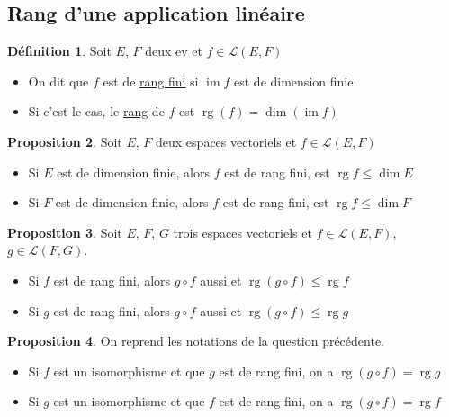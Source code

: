\documentclass[10pt,a4paper]{article}
\theoremstyle{definition}
\newtheorem{proposition}{Proposition}[section]
\newtheorem{definition}[proposition]{Définition}
\DeclareMathOperator{\rg}{rg}
\DeclareMathOperator{\im}{im}
\begin{document}
\subsection{Rang d'une application linéaire}
\begin{definition}
Soit $E$, $F$ deux ev et $f \in \mathcal{L}(E, F)$
\begin{itemize}
\item On dit que $f$ est de \uline{rang fini} si $\im f$ est de dimension finie.
\item Si c'est le cas, le \uline{rang} de $f$ est $\rg (f) = \dim (\im f)$
\end{itemize}
\end{definition}
\begin{proposition}
Soit $E$, $F$ deux espaces vectoriels et $f \in \mathcal{L}(E, F)$
\begin{itemize}
\item Si $E$ est de dimension finie, alors $f$ est de rang fini, est $\rg f \leq \dim E$
\item Si $F$ est de dimension finie, alors $f$ est de rang fini, est $\rg f \leq \dim F$
\end{itemize}
\end{proposition}
\begin{proposition}
Soit $E$, $F$, $G$ trois espaces vectoriels et $f \in \mathcal{L}(E, F)$, $g \in \mathcal{L}(F, G)$.
\begin{itemize}
\item Si $f$ est de rang fini, alors $g \circ f$ aussi et $\rg (g \circ f) \leq \rg f$
\item Si $g$ est de rang fini, alors $g \circ f$ aussi et $\rg (g \circ f) \leq \rg g$
\end{itemize}
\end{proposition}
\begin{proposition}
On reprend les notations de la question précédente.
\begin{itemize}
\item Si $f$ est un isomorphisme et que $g$ est de rang fini, on a $\rg (g \circ f) = \rg g$
\item Si $g$ est un isomorphisme et que $f$ est de rang fini, on a $\rg (g \circ f) = \rg f$
\end{itemize}
\end{proposition}
\end{document}
